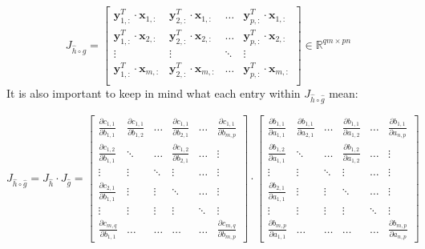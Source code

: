 \documentclass{article}
\begin{document}
\begin{equation}
    J_{\widehat{h}\circ\widehat{g}} = \begin{bmatrix}
    \mathbf{y}_{1,:}^T\cdot\mathbf{x}_{1,:}  &  \mathbf{y}_{2,:}^T\cdot\mathbf{x}_{1,:} & \hdots & \mathbf{y}_{p,:}^T\cdot\mathbf{x}_{1,:} \\
    \mathbf{y}_{1,:}^T\cdot\mathbf{x}_{2,:}  &  \mathbf{y}_{2,:}^T\cdot\mathbf{x}_{2,:} & \hdots & \mathbf{y}_{p,:}^T\cdot\mathbf{x}_{2,:} \\
    \vdots & \vdots & \ddots & \vdots \\
    \mathbf{y}_{1,:}^T\cdot\mathbf{x}_{m,:}  &  \mathbf{y}_{2,:}^T\cdot\mathbf{x}_{m,:} & \hdots & \mathbf{y}_{p,:}^T\cdot\mathbf{x}_{m,:} \\
     \end{bmatrix} \in \mathbb{R}^{qm \times pn}
\end{equation}
It is also important to keep in mind what each entry within $J_{\widehat{h}\circ\widehat{g}}$ mean:
\begin{center}
    $J_{\widehat{h}\circ\widehat{g}}=J_{\widehat{h}}\cdot J_{\widehat{g}} = 
    \begin{bmatrix}
    \frac{\partial c_{1,1}}{\partial b_{1,1}} & \frac{\partial c_{1,1}}{\partial b_{1,2}} &\hdots &  \frac{\partial c_{1,1}}{\partial b_{2,1}} &\hdots & \frac{\partial c_{1,1}}{\partial b_{m,p}} \\
    \frac{\partial c_{1,2}}{\partial b_{1,1}}  & \ddots &\hdots & \frac{\partial c_{1,2}}{\partial b_{2,1}}& \hdots& \vdots \\
    \vdots & \vdots & \ddots & \vdots & \hdots & \vdots\\
    \frac{\partial c_{2,1}}{\partial b_{1,1}} & \vdots & \vdots & \ddots & \hdots & \vdots\\
    \vdots & \vdots & \vdots & \vdots & \ddots & \vdots\\
    \frac{\partial c_{m,q}}{\partial b_{1,1}}  & \hdots & \hdots & \hdots & \hdots & \frac{\partial c_{m,q}}{\partial b_{m,p}}
\end{bmatrix} \cdot
    \begin{bmatrix}
    \frac{\partial b_{1,1}}{\partial a_{1,1}} & \frac{\partial b_{1,1}}{\partial a_{2,1}} &\hdots &  \frac{\partial b_{1,1}}{\partial a_{1,2}} &\hdots & \frac{\partial b_{1,1}}{\partial a_{n,p}} \\
    \frac{\partial b_{1, 2}}{\partial a_{1,1}}  & \ddots &\hdots & \frac{\partial b_{1,2}}{\partial a_{1,2}}& \hdots& \vdots \\
    \vdots & \vdots & \ddots & \vdots & \hdots & \vdots\\
    \frac{\partial b_{2,1}}{\partial a_{1,1}} & \vdots & \vdots & \ddots & \hdots & \vdots\\
    \vdots & \vdots & \vdots & \vdots & \ddots & \vdots\\
    \frac{\partial b_{m,p}}{\partial a_{1,1}}  & \hdots & \hdots & \hdots & \hdots & \frac{\partial b_{m,p}}{\partial a_{n,p}}
\end{bmatrix}
$
\end{center}
\end{document}
